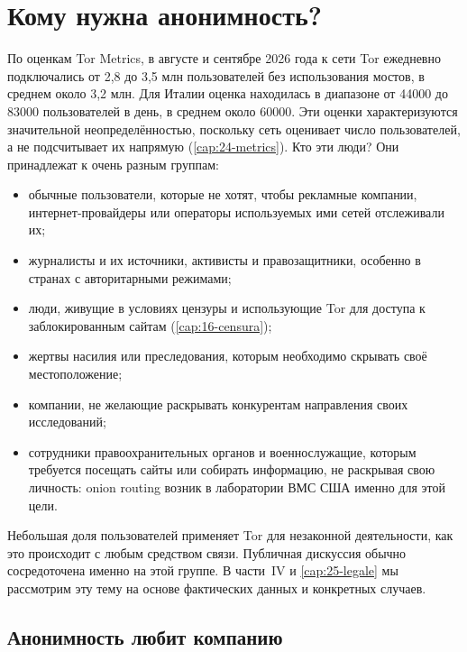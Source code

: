 \section{Кому нужна анонимность?}\label{sec:anon-utenti}

По оценкам Tor Metrics, в августе и сентябре 2026 года к сети Tor ежедневно подключались от 2,8 до 3,5 млн пользователей без использования мостов, в среднем около 3,2 млн. Для Италии оценка находилась в диапазоне от \num{44000} до \num{83000} пользователей в день, в среднем около \num{60000}. Эти оценки характеризуются значительной неопределённостью, поскольку сеть оценивает число пользователей, а не подсчитывает их напрямую (\cref{cap:24-metrics}). Кто эти люди? Они принадлежат к очень разным группам:
\begin{itemize}
  \item обычные пользователи, которые не хотят, чтобы рекламные компании, интернет-провайдеры или операторы используемых ими сетей отслеживали их;
  \item журналисты и их источники, активисты и правозащитники, особенно в странах с авторитарными режимами;
  \item люди, живущие в условиях цензуры и использующие Tor для доступа к заблокированным сайтам (\cref{cap:16-censura});
  \item жертвы насилия или преследования, которым необходимо скрывать своё местоположение;
  \item компании, не желающие раскрывать конкурентам направления своих исследований;
  \item сотрудники правоохранительных органов и военнослужащие, которым требуется посещать сайты или собирать информацию, не раскрывая свою личность: onion routing возник в лаборатории ВМС США именно для этой цели.
\end{itemize}
Небольшая доля пользователей применяет Tor для незаконной деятельности, как это происходит с любым средством связи. Публичная дискуссия обычно сосредоточена именно на этой группе. В части~IV и \cref{cap:25-legale} мы рассмотрим эту тему на основе фактических данных и конкретных случаев.

\subsection{Анонимность любит компанию}

